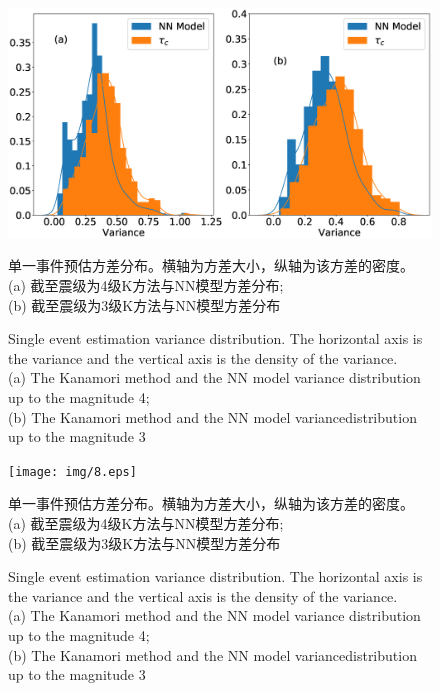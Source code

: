 \begin{figure}[!h] 
\centering 
 \includegraphics[width=\linewidth]{img/9.eps} 
 \renewcommand{\figurename}{图} 
\caption{单一事件预估方差分布。横轴为方差大小，纵轴为该方差的密度。\\
(a) 截至震级为4级K方法与NN模型方差分布;\\
(b) 截至震级为3级K方法与NN模型方差分布} 
\addtocounter{figure}{-1} \vspace{-5pt} 
\renewcommand{\figurename}{Fig} 
\caption{Single event estimation variance distribution. The horizontal axis is the variance and the vertical axis is the density of the variance.\\
(a) The Kanamori method and the NN model variance distribution up to the
magnitude 4; \\
(b) The Kanamori method and the NN model variancedistribution up to the magnitude 3} 
\renewcommand{\figurename}{图} 
\label{fig:network-device-influence.png} 
\end{figure}


\begin{figure}[!h] 
\centering 
 \texttt{[image: img/8.eps]} 
 \renewcommand{\figurename}{图} 
\caption{单一事件预估方差分布。横轴为方差大小，纵轴为该方差的密度。\\
(a) 截至震级为4级K方法与NN模型方差分布;\\
(b) 截至震级为3级K方法与NN模型方差分布} 
\addtocounter{figure}{-1} \vspace{-5pt} 
\renewcommand{\figurename}{Fig} 
\caption{Single event estimation variance distribution. The horizontal axis is the variance and the vertical axis is the density of the variance.\\
(a) The Kanamori method and the NN model variance distribution up to the
magnitude 4; \\
(b) The Kanamori method and the NN model variancedistribution up to the magnitude 3} 
\renewcommand{\figurename}{图} 
\label{fig:network-device-influence.png} 
\end{figure}

